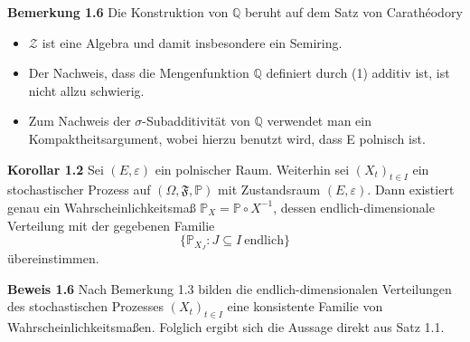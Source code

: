 \textbf{Bemerkung 1.6}
Die Konstruktion von $\mathbb{Q}$ beruht auf dem Satz von Carathéodory
\begin{itemize}
\item $\mathcal{Z}$ ist eine Algebra und damit insbesondere ein Semiring. 
\item Der Nachweis, dass die Mengenfunktion $\mathbb{Q}$ definiert durch (1) additiv ist, ist nicht allzu schwierig.
\item Zum Nachweis der $\sigma$-Subadditivität von $\mathbb{Q}$ verwendet man ein Kompaktheitsargument, wobei hierzu benutzt wird, dass E polnisch ist.
\end{itemize}
\textbf{Korollar 1.2}
Sei $(E,\varepsilon)$ ein polnischer Raum. Weiterhin sei $(X_{t})_{t\in I}$ ein stochastischer Prozess auf $(\Omega, \mathfrak{F}, \mathbb{P})$ mit Zustandsraum $(E,\varepsilon)$. Dann existiert genau ein Wahrscheinlichkeitsmaß ${\mathbb{P}}_{X} = \mathbb{P} \circ {X}^{-1}$, dessen endlich-dimensionale Verteilung mit der gegebenen Familie 
\begin{equation*}
\lbrace \mathbb{P}_{X_{J}} : J \subseteq I \: \mathrm{endlich} \rbrace
\end{equation*} 
übereinstimmen.

\textbf{Beweis 1.6}
Nach Bemerkung 1.3 bilden die endlich-dimensionalen Verteilungen des stochastischen Prozesses $(X_{t})_{t\in I}$ eine konsistente Familie von Wahrscheinlichkeitsmaßen. Folglich ergibt sich die Aussage direkt aus Satz 1.1.

